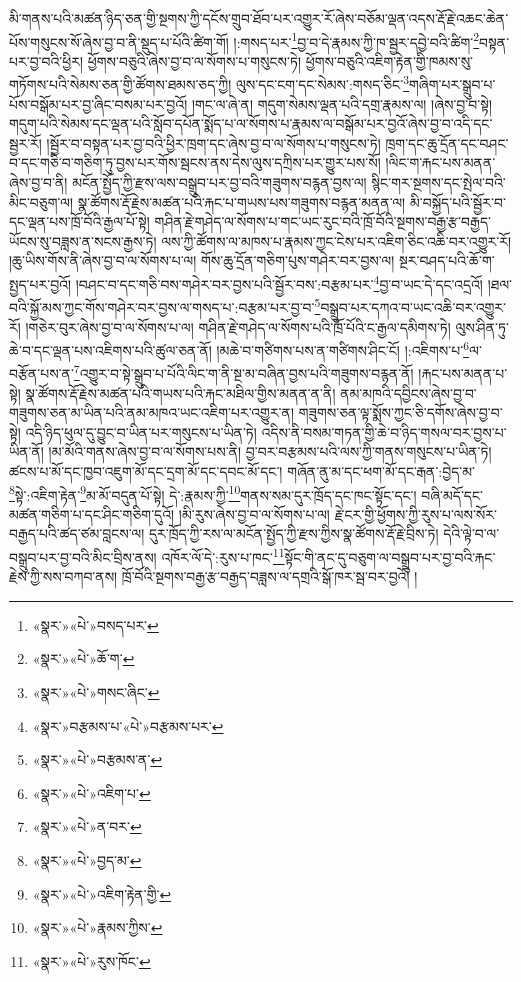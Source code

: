 མི་གནས་པའི་མཚན་ཉིད་ཅན་གྱི་སྔགས་ཀྱི་དངོས་གྲུབ་ཐོབ་པར་འགྱུར་རོ་ཞེས་བཅོམ་ལྡན་འདས་རྡོ་རྗེ་འཆང་ཆེན་པོས་གསུངས་སོ་ཞེས་བྱ་བ་ནི་སྡུད་པ་པོའི་ཚིག་གོ། །:གསད་པར་\footnote{«སྣར་»«པེ་»བསད་པར་}བྱ་བ་དེ་རྣམས་ཀྱི་ཁ་སྦྱར་དབྱེ་བའི་ཚིག་\footnote{«སྣར་»«པེ་»ཆོ་ག་}བསྟན་པར་བྱ་བའི་ཕྱིར། ཕྱོགས་བཅུའི་ཞེས་བྱ་བ་ལ་སོགས་པ་གསུངས་ཏེ། ཕྱོགས་བཅུའི་འཇིག་རྟེན་གྱི་ཁམས་སུ་གཏོགས་པའི་སེམས་ཅན་གྱི་ཚོགས་ཐམས་ཅད་ཀྱི། ལུས་དང་ངག་དང་སེམས་:གསད་ཅིང་\footnote{«སྣར་»«པེ་»གསང་ཞིང་}གཞིག་པར་སྒྲུབ་པ་པོས་བསྒོམ་པར་བྱ་ཞིང་བསམ་པར་བྱའོ། །གང་ལ་ཞེ་ན། གདུག་སེམས་ལྡན་པའི་དགྲ་རྣམས་ལ། །ཞེས་བྱ་བ་སྟེ། གདུག་པའི་སེམས་དང་ལྡན་པའི་སློབ་དཔོན་སྨོད་པ་ལ་སོགས་པ་རྣམས་ལ་བསྒོམ་པར་བྱའོ་ཞེས་བྱ་བ་འདི་དང་སྦྱར་རོ། །སྦྱོར་བ་བསྟན་པར་བྱ་བའི་ཕྱིར་ཁྲག་དང་ཞེས་བྱ་བ་ལ་སོགས་པ་གསུངས་ཏེ། ཁྲག་དང་ཆུ་དྲོན་དང་བཤང་བ་དང་གཅི་བ་གཅིག་ཏུ་བྱས་པར་གོས་སྦངས་ནས་དེས་ལུས་དཀྲིས་པར་གྱུར་པས་སོ། །ལིང་ག་རྐང་པས་མནན་ཞེས་བྱ་བ་ནི། མངོན་སྤྱོད་ཀྱི་རྫས་ལས་བསྒྲུབ་པར་བྱ་བའི་གཟུགས་བརྙན་བྱས་ལ། སྙིང་གར་སྔགས་དང་སྤེལ་བའི་མིང་བཅུག་ལ། སྣ་ཚོགས་རྡོ་རྗེས་མཚན་པའི་རྐང་པ་གཡས་པས་གཟུགས་བརྙན་མནན་ལ། མི་བསྐྱོད་པའི་སྦྱོར་བ་དང་ལྡན་པས་ཁྲོ་བོའི་རྒྱལ་པོ་སྟེ། གཤིན་རྗེ་གཤེད་ལ་སོགས་པ་གང་ཡང་རུང་བའི་ཁྲོ་བོའི་སྔགས་བརྒྱ་རྩ་བརྒྱད་ཡོངས་སུ་བཟླས་ན་སངས་རྒྱས་ཏེ། ལས་ཀྱི་ཚོགས་ལ་མཁས་པ་རྣམས་ཀྱང་ངེས་པར་འཇིག་ཅིང་འཆི་བར་འགྱུར་རོ། །ཆུ་ཡིས་གོས་ནི་ཞེས་བྱ་བ་ལ་སོགས་པ་ལ། གོས་ཆུ་དྲོན་གཅིག་པུས་གཤེར་བར་བྱས་ལ། སྔར་བཤད་པའི་ཆོ་ག་སྤྱད་པར་བྱའོ། །བཤང་བ་དང་གཅི་བས་གཤེར་བར་བྱས་པའི་སྦྱོར་བས་:བརྩམ་པར་\footnote{«སྣར་»བརྩམས་པ་«པེ་»བརྩམས་པར་}བྱ་བ་ཡང་དེ་དང་འདྲའོ། །ཐལ་བའི་སྐྱོ་མས་ཀྱང་གོས་གཤེར་བར་བྱས་ལ་གསད་པ་:བརྩམ་པར་བྱ་བ་\footnote{«སྣར་»«པེ་»བརྩམས་ན་}བསྒྲུབ་པར་དཀའ་བ་ཡང་འཆི་བར་འགྱུར་རོ། །གཅེར་བུར་ཞེས་བྱ་བ་ལ་སོགས་པ་ལ། གཤིན་རྗེ་གཤེད་ལ་སོགས་པའི་ཁྲོ་པོའི་ང་རྒྱལ་དམིགས་ཏེ། ལུས་ཤིན་ཏུ་ཆེ་བ་དང་ལྡན་པས་འཇིགས་པའི་ཚུལ་ཅན་ནོ། །མཆེ་བ་གཙིགས་པས་ན་གཙིགས་ཤིང་ངོ། །:འཇིགས་པ་\footnote{«སྣར་»«པེ་»འཇིག་པ་}ལ་བརྩོན་པས་ན་\footnote{«སྣར་»«པེ་»ན་བར་}འགྱུར་བ་སྟེ་སྒྲུབ་པ་པོའི་ལིང་ག་ནི་སྔ་མ་བཞིན་བྱས་པའི་གཟུགས་བརྙན་ནོ། །རྐང་པས་མནན་པ་སྟེ། སྣ་ཚོགས་རྡོ་རྗེས་མཚན་པའི་གཡས་པའི་རྐང་མཐིལ་གྱིས་མནན་ན་ནི། ནམ་མཁའི་དབྱིངས་ཞེས་བྱ་བ་གཟུགས་ཅན་མ་ཡིན་པའི་ནམ་མཁའ་ཡང་འཇིག་པར་འགྱུར་ན། གཟུགས་ཅན་ལྟ་སྨོས་ཀྱང་ཅི་དགོས་ཞེས་བྱ་བ་སྟེ། འདི་ཉིད་ཕུལ་དུ་བྱུང་བ་ཡིན་པར་གསུངས་པ་ཡིན་ཏེ། འདིས་ནི་བསམ་གཏན་གྱི་ཆེ་བ་ཉིད་གསལ་བར་བྱས་པ་ཡིན་ནོ། །མ་མོའི་གནས་ཞེས་བྱ་བ་ལ་སོགས་པས་ནི། བྱ་བར་བརྩམས་པའི་ལས་ཀྱི་གནས་གསུངས་པ་ཡིན་ཏེ། ཚངས་པ་མོ་དང་ཁྱབ་འཇུག་མོ་དང་དྲག་མོ་དང་དབང་མོ་དང་། གཞོན་ནུ་མ་དང་ཕག་མོ་དང་རྒན་:བྱེད་མ་\footnote{«སྣར་»«པེ་»བྱད་མ་}སྟེ་:འཇིག་རྟེན་\footnote{«སྣར་»«པེ་»འཇིག་རྟེན་གྱི་}མ་མོ་བདུན་པོ་སྟེ། དེ་:རྣམས་ཀྱི་\footnote{«སྣར་»«པེ་»རྣམས་ཀྱིས་}གནས་སམ་དུར་ཁྲོད་དང་ཁང་སྟོང་དང་། བཞི་མདོ་དང་མཚན་གཅིག་པ་དང་ཤིང་གཅིག་དུའོ། །མི་རུས་ཞེས་བྱ་བ་ལ་སོགས་པ་ལ། རྗེ་ངར་གྱི་ཕྱོགས་ཀྱི་རུས་པ་ལས་སོར་བརྒྱད་པའི་ཚད་ཙམ་བླངས་ལ། དུར་ཁྲོད་ཀྱི་རས་ལ་མངོན་སྤྱོད་ཀྱི་རྫས་ཀྱིས་སྣ་ཚོགས་རྡོ་རྗེ་བྲིས་ཏེ། དེའི་ལྟེ་བ་ལ་བསྒྲུབ་པར་བྱ་བའི་མིང་བྲིས་ནས། འཁོར་ལོ་དེ་:རུས་པ་ཁང་\footnote{«སྣར་»«པེ་»རུས་ཁོང་}སྟོང་གི་ནང་དུ་བཅུག་ལ་བསྒྲུབ་པར་བྱ་བའི་རྐང་རྗེས་ཀྱི་སས་བཀབ་ནས། ཁྲོ་བོའི་སྔགས་བརྒྱ་རྩ་བརྒྱད་བཟླས་ལ་དགྲའི་སྒོ་ཁར་སྦ་བར་བྱའོ། །
